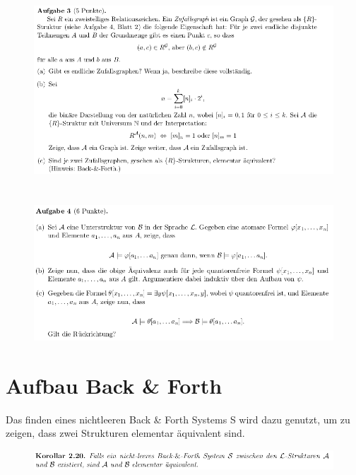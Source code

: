\documentclass[a4paper]{scrartcl}
\begin{document}
\section*{}%
\label{sec:aufgabe_3}

    \begin{figure}[H]
        \centering
        \includegraphics[scale=0.6]{./A-3.png}
        \label{fig:}
    \end{figure}

\section*{}%
\label{sec:aufgabe_4}

    \begin{figure}[H]
        \centering
        \includegraphics[scale=0.6]{./A-4.png}
        \label{fig:}
    \end{figure}


\section*{Aufbau Back \& Forth}%
\label{sec:aufbau_back_forth}
    Das finden eines nichtleeren Back \& Forth Systems S wird dazu genutzt, um zu zeigen, dass zwei Strukturen elementar äquivalent sind.
    \begin{figure}[H]
        \centering
        \includegraphics[scale=0.6]{./B&F-EA.png}
        \label{fig:}
    \end{figure}
\end{document}
